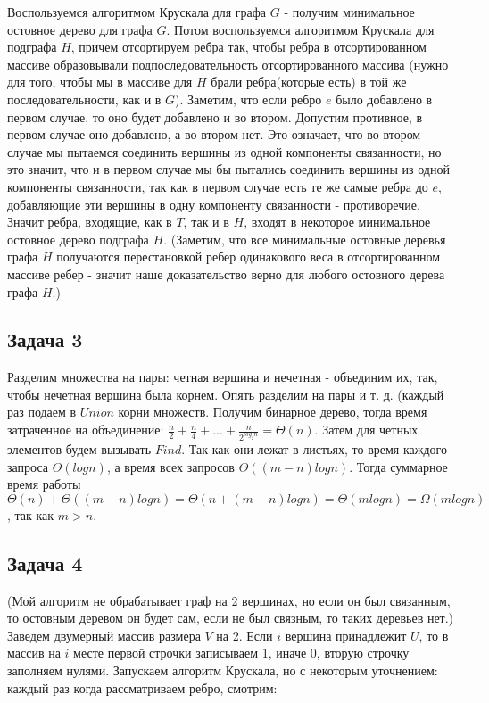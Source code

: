 \documentclass[a4paper,14pt]{article} %
\begin{document}
Воспользуемся алгоритмом Крускала для графа $G$ - получим минимальное остовное дерево для графа $G$.  Потом воспользуемся алгоритмом Крускала для подграфа $H$,  причем отсортируем ребра так,  чтобы ребра в отсортированном массиве образовывали подпоследовательность отсортированного массива (нужно для того,  чтобы мы в массиве для $H$ брали ребра(которые есть) в той же последовательности,  как и в $G$).  Заметим,  что если ребро $e$ было добавлено в первом случае,  то оно будет добавлено и во втором.  Допустим противное,  в первом случае оно добавлено,  а во втором нет.  Это означает,  что во втором случае мы пытаемся соединить вершины из одной компоненты связанности,  но это значит,  что и в первом случае мы бы пытались соединить вершины из одной компоненты связанности,  так как в первом случае есть те же самые ребра до $e$,  добавляющие эти вершины в одну компоненту связанности - противоречие.  Значит ребра,  входящие,  как в $T$,  так и в $H$,  входят в некоторое минимальное остовное дерево подграфа $H$.
(Заметим,  что все минимальные остовные деревья графа $H$ получаются перестановкой ребер одинакового веса в отсортированном массиве ребер - значит наше доказательство верно для любого остовного дерева графа $H$.)
 
\subsection{Задача 3}
 
Разделим множества на пары: четная вершина и нечетная - объединим их,  так, чтобы нечетная вершина была корнем.  Опять разделим на пары и т. д. (каждый раз подаем в $Union$ корни множеств.  Получим бинарное дерево,  тогда время затраченное на объединение: $\frac{n}{2} + \frac{n}{4} + ...  + \frac{n}{2^{log_2n}} = \Theta(n)$.  Затем для четных элементов будем вызывать $Find$.  Так как они лежат в листьях,  то время каждого запроса $\Theta(logn)$,  а время всех запросов $\Theta((m-n)logn)$.  Тогда суммарное время работы $\Theta(n) + \Theta((m-n)logn) = \Theta(n + (m-n)logn) = \Theta(mlogn) = \Omega(mlogn)$,  так как $m > n$.
  
\subsection{Задача 4}

(Мой алгоритм не обрабатывает граф на 2 вершинах,  но  если он был связанным, то остовным деревом он будет сам,  если не был связным, то таких деревьев нет.)
Заведем двумерный массив размера $V$ на 2.  Если $i$  вершина принадлежит $U$,  то в массив на $i$ месте первой строчки записываем 1,  иначе 0,  вторую строчку заполняем нулями.  Запускаем алгоритм Крускала,  но с некоторым уточнением: каждый раз когда рассматриваем ребро,  смотрим:
\end{document}
